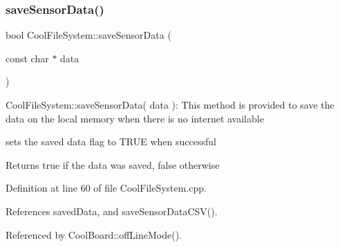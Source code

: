 \mbox{\label{classCoolFileSystem_afa3a4feae94871d4d3b6bebb701c2e67}} 
\subsubsection{\texorpdfstring{save\+Sensor\+Data()}{saveSensorData()}}
{\footnotesize\ttfamily bool Cool\+File\+System\+::save\+Sensor\+Data (\begin{DoxyParamCaption}\item[{const char $\ast$}]{data }\end{DoxyParamCaption})}

Cool\+File\+System\+::save\+Sensor\+Data( data )\+: This method is provided to save the data on the local memory when there is no internet available

sets the saved data flag to T\+R\+UE when successful

\begin{DoxyReturn}{Returns}
true if the data was saved, false otherwise 
\end{DoxyReturn}


Definition at line 60 of file Cool\+File\+System.\+cpp.



References saved\+Data, and save\+Sensor\+Data\+C\+S\+V().



Referenced by Cool\+Board\+::off\+Line\+Mode().


